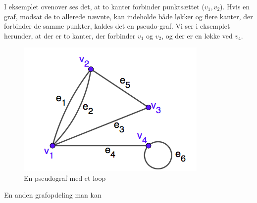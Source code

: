I eksemplet ovenover ses det, at to kanter forbinder punktsættet ($v_{1},v_{2}$). Hvis en graf, modsat de to allerede nævnte, kan indeholde både løkker og flere kanter, der forbinder de samme punkter, kaldes det en pseudo-graf. Vi ser i eksemplet herunder, at der er to kanter, der forbinder $v_{1}$ og $v_{2}$, og der er en løkke ved $v_{4}$.
\begin{figure}[H]
\centering
\includegraphics[scale=0.5]{fig/img/pseudograf.png}
\caption{En pseudograf med et loop}
\label{fig:pseudo}
\end{figure}
En anden grafopdeling man kan 
